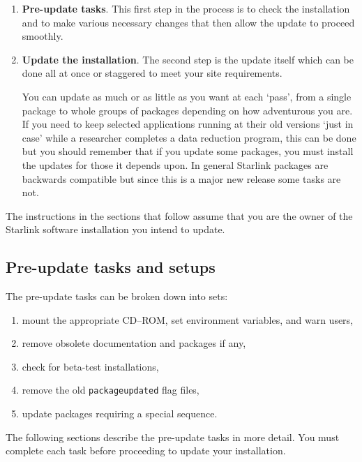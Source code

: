 \documentclass[twoside,11pt]{article}
\newcommand{\xlabel}[1]{}
\renewcommand{\_}{\texttt{\symbol{95}}}
\newcommand{\cdrom}{CD--ROM}
\newcommand{\cdrom}{CD-ROM}
\begin{document}
\begin{enumerate}

\item \textbf{Pre-update tasks}.  This first step in the process
is to check the installation and to make various necessary changes that
then allow the update to proceed smoothly.

\item \textbf{Update the installation}.  The second step is the update
itself which can be done all at once or staggered to meet your site
requirements.

You can update as much or as little as you want at each `pass', from
a single package to whole groups of packages depending on how adventurous
you are.  If you need to keep selected applications running at their
old versions `just in case' while a researcher completes a data
reduction program, this can be done but you should remember that if you
update some packages, you must install the updates for those it depends
upon.  In general Starlink packages are backwards compatible but since this
is a major new release some tasks are not.

\end{enumerate}

The instructions in the sections that follow assume that you are the
owner of the Starlink software installation you intend to update.

\subsection{\xlabel{pre-update_tasks_and_setups}Pre-update tasks and setups}
\label{pre-update_tasks_and_setups}

The pre-update tasks can be broken down into sets: 

\begin{enumerate}
\item mount the appropriate \cdrom, set environment variables, and warn users,
\item remove obsolete documentation and packages if any,
\item check for beta-test installations,
\item remove the old \texttt{package\_updated} flag files,
\item update packages requiring a special sequence.
\end{enumerate}

The following sections describe the pre-update tasks in more detail.  You 
must complete each task before proceeding to update your installation.
\end{document}
